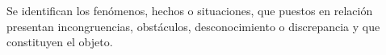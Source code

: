 Se identifican los fenómenos, hechos o situaciones, que puestos en relación presentan incongruencias, obstáculos, desconocimiento o discrepancia y que constituyen el objeto.